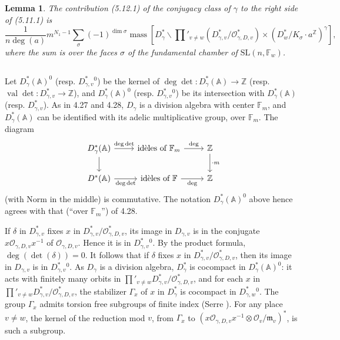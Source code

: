 \documentclass[11pt,a4paper]{article}
\theoremstyle{plain}
\newtheorem{lemma}[theorem]{Lemma}
\theoremstyle{definition}
\DeclareMathOperator{\val}{val}
\DeclareMathOperator{\mass}{mass}
\newcommand{\Z}{\mathbb{Z}}
\newcommand{\SL}{\mathrm{SL}}
\begin{document}
\begin{lemma}
The contribution (5.12.1) of the conjugacy class of $\gamma$ to the right side of (5.11.1) is
\begin{equation}
\frac{1}{n\deg(a)} m^{N_1-1} \sum_\sigma (-1)^{\dim \sigma} \mass[D_\gamma^* \backslash \prod'_{v \neq w} (D_{\gamma,v}^*/\mathcal{O}_{\gamma,D,v}^*) \times (D_w^*/K_\sigma \cdot a^{\Z})^\gamma], \tag{5.13.1}
\end{equation}
where the sum is over the faces $\sigma$ of the fundamental chamber of $\SL(n, \mathbb{F}_w)$.
\end{lemma}

\subsection{}
Let $D_\gamma^*(\mathbb{A})^0$ (resp. $D_{\gamma,v}^*{}^0$) be the kernel of $\deg \det: D_\gamma^*(\mathbb{A}) \to \Z$ (resp. $\val \det: D_{\gamma,v}^* \to \Z$), and $D_\gamma^*(\mathbb{A})^0$ (resp. $D_{\gamma,v}^*{}^0$) be its intersection with $D_\gamma^*(\mathbb{A})$ (resp. $D_{\gamma,v}^*$). As in 4.27 and 4.28, $D_\gamma$ is a division algebra with center $\mathbb{F}_m$, and $D_\gamma^*(\mathbb{A})$ can be identified with its adelic multiplicative group, over $\mathbb{F}_m$. The diagram
\[
\begin{tikzcd}
D_\gamma^*(\mathbb{A}) \arrow[r, "\deg \det"] \arrow[d] & \text{id\`eles of $\mathbb{F}_m$} \arrow[r, "\deg"] & \Z \arrow[d, "\cdot m"] \\
D^*(\mathbb{A}) \arrow[r, "\deg \det"'] & \text{id\`eles of $\mathbb{F}$} \arrow[r, "\deg"'] & \Z
\end{tikzcd}
\]
(with Norm in the middle) is commutative. The notation $D_\gamma^*(\mathbb{A})^0$ above hence agrees with that (``over $\mathbb{F}_m$'') of 4.28.

If $\delta$ in $D_{\gamma,v}^*$ fixes $x$ in $D_{\gamma,v}^*/\mathcal{O}_{\gamma,D,v}^*$, its image in $D_{\gamma,v}$ is in the conjugate $x \mathcal{O}_{\gamma,D,v} x^{-1}$ of $\mathcal{O}_{\gamma,D,v}$. Hence it is in $D_{\gamma,v}^*{}^0$. By the product formula, $\deg(\det(\delta)) = 0$. It follows that if $\delta$ fixes $x$ in $D_{\gamma,v}^*/\mathcal{O}_{\gamma,D,v}^*$, then its image in $D_{\gamma,v}$ is in $D_{\gamma,v}^*{}^0$. As $D_\gamma$ is a division algebra, $D_\gamma^*$ is cocompact in $D_\gamma^*(\mathbb{A})^0$: it acts with finitely many orbits in $\prod'_{v \neq w} D_{\gamma,v}^*/\mathcal{O}_{\gamma,D,v}^*$, and for each $x$ in $\prod'_{v \neq w} D_{\gamma,v}^*/\mathcal{O}_{\gamma,D,v}^*$, the stabilizer $\Gamma_x$ of $x$ in $D_\gamma^*$ is cocompact in $D_{\gamma,w}^*{}^0$. The group $\Gamma_x$ admits torsion free subgroups of finite index (Serre \cite[Th. 4(b)]{S}). For any place $v \neq w$, the kernel of the reduction mod $v$, from $\Gamma_x$ to $(x \mathcal{O}_{\gamma,D,v} x^{-1} \otimes \mathcal{O}_v/\mathfrak{m}_v)^*$, is such a subgroup.
\end{document}
